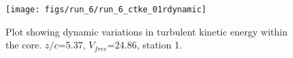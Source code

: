 \begin{figure}[H]
\centering
\texttt{[image: figs/run\_6/run\_6\_ctke\_01rdynamic]}
\caption{Plot showing dynamic variations in turbulent kinetic energy within the core. $z/c$=5.37, $V_{free}$=24.86, station 1.}
\label{fig:run_6_ctke_01rdynamic}
\end{figure}



